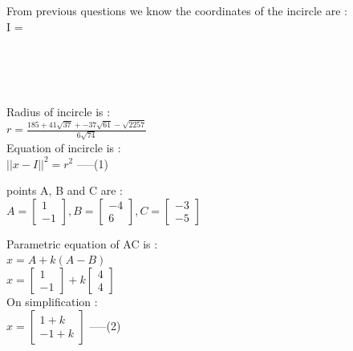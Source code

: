 \documentclass[journal,12pt,twocolumn]{IEEEtran}
\theoremstyle{remark}
\begin{document}
\begin{flushleft}

	From previous questions we know the coordinates of the incircle are : \\
	\bigskip
	I = 
	\begin {bmatrix}
		 \\ \\
	\end{bmatrix}
	\\
	\bigskip
	Radius of incircle is :\\
	\bigskip
	$r = \frac{185+41\sqrt{37}+-37\sqrt{61}-\sqrt{2257}}{6\sqrt{74}}$
	\\
	\bigskip
	Equation of incircle is : \\
	\bigskip
	${\lvert \lvert x-I \rvert \rvert}^2 = {r}^2$ -----(1)\\
	\bigskip

	points A, B and C are : \\
	\bigskip
	$A = \begin{bmatrix}
		1\\
		-1
	\end{bmatrix}, 
	B = \begin{bmatrix}
		-4\\
		6
	\end{bmatrix}, 
	C = \begin{bmatrix}
		-3\\
		-5
	\end{bmatrix}$
	\\
	\bigskip

	Parametric equation of AC is :\\
	\bigskip
	$x = A + k(A-B)$\\
	\bigskip
	$x = \begin{bmatrix}
		1\\
		-1
	\end{bmatrix}
	+ k\begin{bmatrix}
		4\\
		4
	\end{bmatrix}$\\
	\bigskip
	On simplification : \\
	\bigskip
	$x = \begin{bmatrix}
		1+k\\
		-1+k
	\end{bmatrix}$ -----(2)\\


\end{flushleft}
\end{document}
